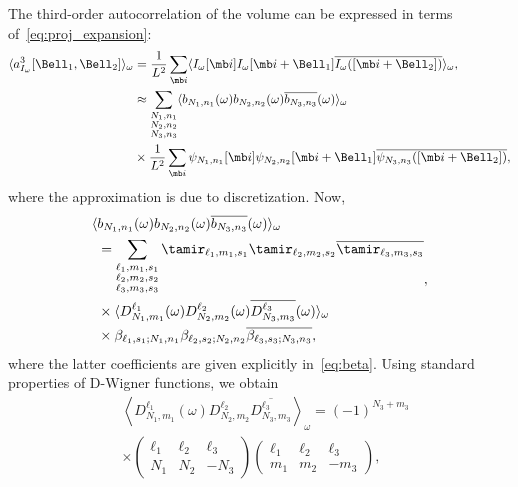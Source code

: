 \documentclass[9pt,twocolumn,twoside,lineno]{pnas-new}
\begin{document}
The third-order autocorrelation of the volume can be expressed in terms of~\eqref{eq:proj_expansion}:
\begin{align} \label{eq:third_order_ac_volume}
\langle
a^3_{I_{\omega}}[\Bell_1, \Bell_2]\rangle_{\omega} &= \frac{1}{L^2}\sum_{\mb i}\langle I_{\omega}[\mb i]I_{\omega}[\mb i+\Bell_1]\overline{I_{\omega}([\mb i+\Bell_2])}\rangle_{\omega},\\
&\approx \sum_{\substack{N_1,n_1\\N_2,n_2\\N_3,n_3}} \langle b_{N_1,n_1}(\omega)b_{N_2,n_2}(\omega)\overline{b_{N_3,n_3}}(\omega)\rangle_{\omega}\nonumber\\&\times \frac{1}{L^2}\sum_{\mb i}\psi_{N_1,n_1}[\mb i]\psi_{N_2,n_2}[\mb i+\Bell_1]\overline{\psi_{N_3,n_3}([\mb i+\Bell_2])},\nonumber\end{align}
where the approximation is due to discretization. 
Now,
\[\begin{aligned} \langle &b_{N_1,n_1}(\omega)b_{N_2,n_2}(\omega)\overline{b_{N_3,n_3}}(\omega)\rangle_{\omega} \\&= \sum_{\substack{\ell_1,m_1,s_1\\\ell_2,m_2,s_2\\\ell_3,m_3,s_3}}\tamir_{\ell_1,m_1,s_1}\tamir_{\ell_2,m_2,s_2}\overline{\tamir_{\ell_3,m_3,s_3}}\\&\times \langle D_{N_1,m_1}^{\ell_1}(\omega)D_{N_2,m_2}^{\ell_2}(\omega)\overline{D_{N_3,m_3}^{\ell_3}}(\omega)\rangle_{\omega}\\
&\times \beta_{\ell_1,s_1;N_1,n_1}\beta_{\ell_2,s_2;N_2,n_2}\overline{\beta_{\ell_3,s_3;N_3,n_3}},\end{aligned},\]
where the latter coefficients are given explicitly in~\eqref{eq:beta}. Using standard properties of D-Wigner functions, we obtain  
\begin{align}
&\left\langle D_{N_1,m_1}^{\ell_1}(\omega)D_{N_2,m_2}^{\ell_2}\overline{D_{N_3,m_3}^{\ell_3}}\right\rangle_{\omega} = (-1)^{N_3+m_3}\\&\times \left(\begin{array}{ccc}\ell_1 & \ell_2  & \ell_3\\ N_1 & N_2 & -N_3\end{array}\right)\left(\begin{array}{ccc}\ell_1 & \ell_2  & \ell_3\\ m_1 & m_2 & -m_3\end{array}\right),\nonumber
\end{align}
\end{document}
